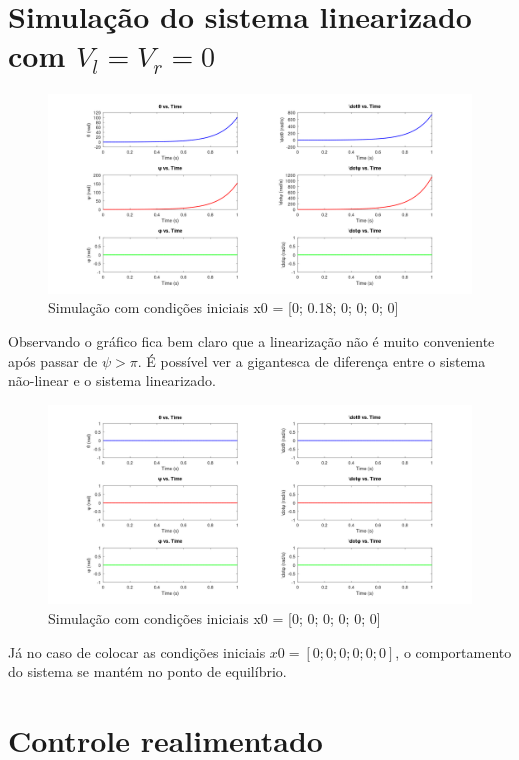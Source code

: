 \documentclass[10pt]{article}
\begin{document}
\newpage

\section{Simulação do sistema linearizado com $V_l = V_r = 0$}

\begin{figure}[h]
    \centering
    \includegraphics[scale=0.2]{ode45_1_l.png}
    \caption{Simulação com condições iniciais x0 = [0; 0.18; 0; 0; 0; 0]}
\end{figure}

\quad Observando o gráfico fica bem claro que a linearização não é muito conveniente após passar de $\psi > \pi$.
É possível ver a gigantesca de diferença entre o sistema não-linear e o sistema linearizado.

\begin{figure}[h]
    \centering
    \includegraphics[scale=0.2]{ode45_2_l.png}
    \caption{Simulação com condições iniciais x0 = [0; 0; 0; 0; 0; 0]}
\end{figure}

\quad Já no caso de colocar as condições iniciais $x0 = [0; 0; 0; 0; 0; 0]$,
o comportamento do sistema se mantém no ponto de equilíbrio.

\newpage

\section{Controle realimentado}
\end{document}
